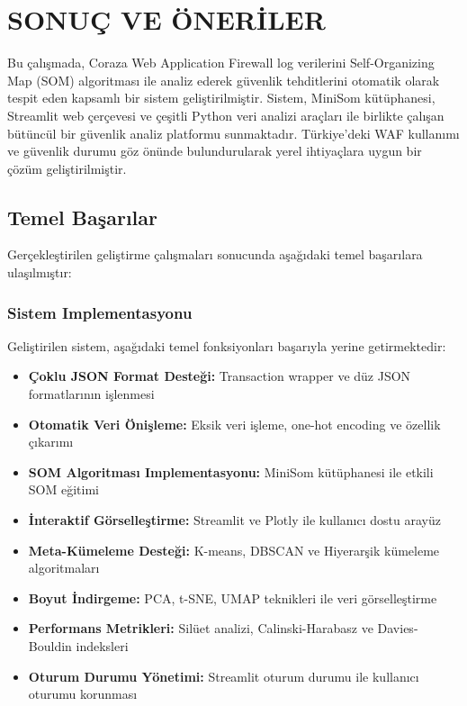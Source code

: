 \section{SONUÇ VE ÖNERİLER}

Bu çalışmada, Coraza Web Application Firewall log verilerini Self-Organizing Map (SOM) algoritması ile analiz ederek güvenlik tehditlerini otomatik olarak tespit eden kapsamlı bir sistem geliştirilmiştir. Sistem, MiniSom kütüphanesi, Streamlit web çerçevesi ve çeşitli Python veri analizi araçları ile birlikte çalışan bütüncül bir güvenlik analiz platformu sunmaktadır. Türkiye'deki WAF kullanımı ve güvenlik durumu \cite{koc2022waf_turkiye,tbd_rapor2022} göz önünde bulundurularak yerel ihtiyaçlara uygun bir çözüm geliştirilmiştir.

\subsection{Temel Başarılar}

Gerçekleştirilen geliştirme çalışmaları sonucunda aşağıdaki temel başarılara ulaşılmıştır:

\subsubsection{Sistem Implementasyonu}

Geliştirilen sistem, aşağıdaki temel fonksiyonları başarıyla yerine getirmektedir:

\begin{itemize}
    \item \textbf{Çoklu JSON Format Desteği:} Transaction wrapper ve düz JSON formatlarının işlenmesi
    \item \textbf{Otomatik Veri Önişleme:} Eksik veri işleme, one-hot encoding ve özellik çıkarımı
    \item \textbf{SOM Algoritması Implementasyonu:} MiniSom kütüphanesi ile etkili SOM eğitimi
    \item \textbf{İnteraktif Görselleştirme:} Streamlit ve Plotly ile kullanıcı dostu arayüz
    \item \textbf{Meta-Kümeleme Desteği:} K-means, DBSCAN ve Hiyerarşik kümeleme algoritmaları
    \item \textbf{Boyut İndirgeme:} PCA, t-SNE, UMAP teknikleri ile veri görselleştirme
    \item \textbf{Performans Metrikleri:} Silüet analizi, Calinski-Harabasz ve Davies-Bouldin indeksleri
    \item \textbf{Oturum Durumu Yönetimi:} Streamlit oturum durumu ile kullanıcı oturumu korunması
\end{itemize}

